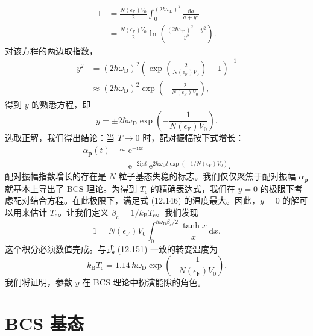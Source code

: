 \begin{align*}
1&=\frac{N\left(\epsilon_{\mathrm F}\right)V_0}{2}\int_0^{(2\hbar\omega_{\mathrm D})^2}\frac{\mathrm d a}{a+y^2}\\
&=\frac{N\left(\epsilon_{\mathrm F}\right)V_0}{2}\ln\left(\frac{(2\hbar\omega_{\mathrm D})^2+y^2}{y^2}\right). \tag{12.147}
\end{align*}
对该方程的两边取指数，
\begin{align*}
y^2&=\left(2\hbar\omega_{\mathrm D}\right)^2\left(\exp\left(\frac{2}{N\left(\epsilon_{\mathrm F}\right)V_0}\right)-1\right)^{-1}\\
&\approx\left(2\hbar\omega_{\mathrm D}\right)^2\exp\left(-\frac{2}{N\left(\epsilon_{\mathrm F}\right)V_0}\right), \tag{12.148}
\end{align*}
得到 $y$ 的熟悉方程，即
\begin{equation*}
y=\pm 2\hbar\omega_{\mathrm D}\exp\left(-\frac{1}{N\left(\epsilon_{\mathrm F}\right)V_0}\right). \tag{12.149}
\end{equation*}
选取正解，我们得出结论：当 $T\to 0$ 时，配对振幅按下式增长：
\begin{align*}
\alpha_{\mathbf p}(t)&\simeq\mathrm e^{-\mathrm i zt}\\
&=\mathrm e^{-2\mathrm i\mu t}\,\mathrm e^{2\hbar\omega_{\mathrm D}t\exp(-1/N(\epsilon_{\mathrm F})V_0)}. \tag{12.150}
\end{align*}
配对振幅指数增长的存在是 $N$ 粒子基态失稳的标志。我们仅仅聚焦于配对振幅 $\alpha_{\mathbf p}$ 就基本上导出了 BCS 理论。为得到 $T_{\mathrm c}$ 的精确表达式，我们在 $y=0$ 的极限下考虑配对结合方程。在此极限下，满足式 (12.146) 的温度最大。因此，$y=0$ 的解可以用来估计 $T_{\mathrm c}$。让我们定义 $\beta_{\mathrm c}=1/k_{\mathrm B}T_{\mathrm c}$。我们发现
\begin{equation*}
1=N\left(\epsilon_{\mathrm F}\right)V_0\int_0^{\hbar\omega_{\mathrm D}\beta_{\mathrm c}/2}\frac{\tanh x}{x}\,\mathrm d x. \tag{12.151}
\end{equation*}
这个积分必须数值完成。与式 (12.151) 一致的转变温度为
\begin{equation*}
k_{\mathrm B}T_{\mathrm c}=1.14\,\hbar\omega_{\mathrm D}\exp\left(-\frac{1}{N\left(\epsilon_{\mathrm F}\right)V_0}\right). \tag{12.152}
\end{equation*}
我们将证明，参数 $y$ 在 BCS 理论中扮演能隙的角色。

\section{BCS 基态}

